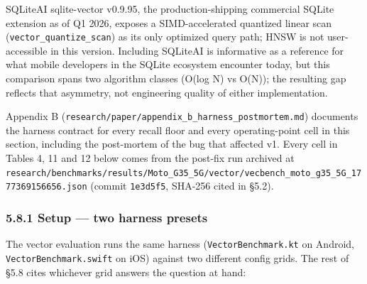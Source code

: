 SQLiteAI sqlite-vector v0.9.95, the production-shipping commercial SQLite
extension as of Q1 2026, exposes a SIMD-accelerated quantized linear scan
(\texttt{vector\_quantize\_scan}) as its only optimized query path; HNSW is not
user-accessible in this version. Including SQLiteAI is informative as a
reference for what mobile developers in the SQLite ecosystem encounter today,
but this comparison spans two algorithm classes (O(log N) vs O(N)); the
resulting gap reflects that asymmetry, not engineering quality of either
implementation.

Appendix B (\texttt{research/paper/appendix\_b\_harness\_postmortem.md})
documents the harness contract for every recall floor and every operating-point
cell in this section, including the post-mortem of the bug that affected v1.
Every cell in Tables 4, 11 and 12 below comes from the post-fix run archived at
\texttt{research/benchmarks/results/Moto\_G35\_5G/vector/vecbench\_moto\_g35\_5G\_1777369156656.json}
(commit \texttt{1e3d5f5}, SHA-256 cited in §5.2).

\subsubsection{5.8.1 Setup --- two harness
presets}\label{setup-two-harness-presets}

The vector evaluation runs the same harness (\texttt{VectorBenchmark.kt} on
Android, \texttt{VectorBenchmark.swift} on iOS) against two different config
grids. The rest of §5.8 cites whichever grid answers the question at hand:


